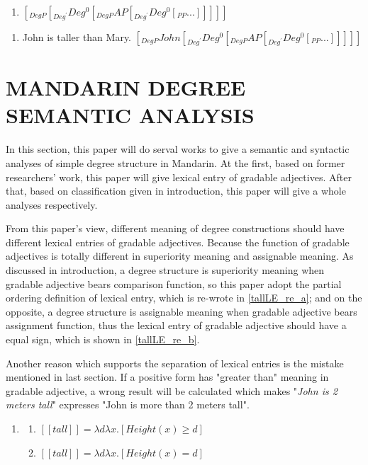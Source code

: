 \documentclass{ctexart}
\begin{document}
\begin{enumerate}
    \item \label{deg_p_shell} $[_{DegP} [_{Deg^{\prime}} Deg^0 [_{DegP} AP [_{Deg^{\prime}} Deg^0 [_{PP}...]]]]] $
\end{enumerate}

\begin{enumerate}
    \item \label{deg_p_shell_example} 
    John is taller than Mary.
    $[_{DegP} John [_{Deg^{\prime}} Deg^0 [_{DegP} AP [_{Deg^{\prime}} Deg^0 [_{PP}...]]]]] $
\end{enumerate}

\section{MANDARIN DEGREE SEMANTIC ANALYSIS}

\noindent
In this section, this paper will do serval works to give a semantic and syntactic analyses of simple degree structure in Mandarin. At the first, based on former researchers' work, this paper will give lexical entry of gradable adjectives. After that, based on classification given in introduction, this paper will give a whole analyses respectively.

From this paper's view, different meaning of degree constructions should have different lexical entries of gradable adjectives. Because the function of gradable adjectives is totally different in superiority meaning and assignable meaning. As discussed in introduction, a degree structure is superiority meaning when gradable adjective bears comparison function, so this paper adopt the partial ordering definition of lexical entry, which is re-wrote in \ref{tallLE_re_a}; and on the opposite, a degree structure is assignable meaning when gradable adjective bears assignment function, thus the lexical entry of gradable adjective should have a equal sign, which is shown in \ref{tallLE_re_b}.

Another reason which supports the separation of lexical entries is the mistake mentioned in last section. If a positive form has "greater than" meaning in gradable adjective, a wrong result will be calculated which makes "\textit{John is 2 meters tall}" expresses "John is more than 2 meters tall".

\begin{enumerate}
    \item \label{tallLE_re}
    
    \begin{enumerate}
        \item \label{tallLE_re_a} 
        $[\![tall]\!]=\lambda d \lambda x.[Height(x) \geq d]$
    
        \item \label{tallLE_re_b} 
        $[\![tall]\!]=\lambda d \lambda x.[Height(x) = d]$
    
    \end{enumerate}
\end{enumerate}
\end{document}
